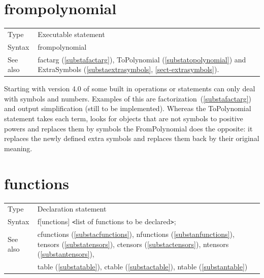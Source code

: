 





\vspace{10mm}


\section{frompolynomial}
\label{substafrompolynomial}

\noindent \begin{tabular}{ll}
Type & Executable statement\\
Syntax & frompolynomial
\\ See also & factarg (\ref{substafactarg}), ToPolynomial 
(\ref{substatopolynomial}) and ExtraSymbols (\ref{substaextrasymbols},
\ref{sect-extrasymbols}).
\end{tabular} \vspace{4mm}

\noindent Starting with version 4.0 of \FORM{} some built in operations or
statements can only deal with symbols and numbers. Examples of this are 
factorization~(\ref{substafactarg}) and output simplification (still to be 
implemented). Whereas the ToPolynomial statement takes each term, looks for objects 
that are not symbols to positive powers and replaces them by symbols the 
FromPolynomial does the opposite: it replaces the newly defined extra 
symbols and replaces them back by their original meaning.
\vspace{10mm}

 
\section{functions}
\label{substafunctions}

\noindent \begin{tabular}{ll}
Type & Declaration statement\\
Syntax & f[unctions] {\tt<}list of functions to be declared{\tt>}; \\
See also & cfunctions (\ref{substacfunctions}),
           nfunctions (\ref{substanfunctions}),
           tensors (\ref{substatensors}),
           ctensors (\ref{substactensors}),
           ntensors (\ref{substantensors}), \\ &
           table (\ref{substatable}),
           ctable (\ref{substactable}),
           ntable (\ref{substantable})
\end{tabular} \vspace{4mm}

